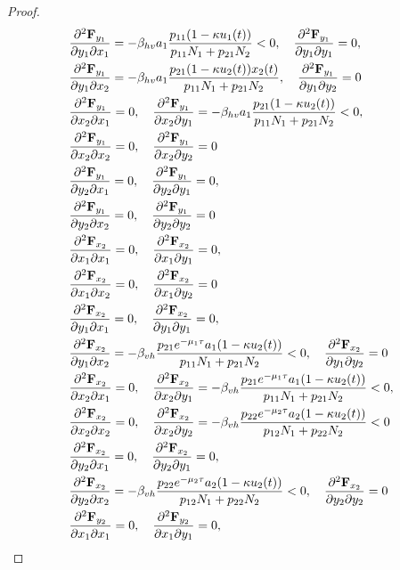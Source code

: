 \begin{proof}
{\begin{align*}
    &\pdv{\mathbf{F}_{y_1}}{y_1}{x_1} = -\beta_{hv} a_1 \frac{p_{11} (1-\kappa u_1(t))}{p_{11} N_1 + p_{21} N_2} < 0, \quad
    \pdv{\mathbf{F}_{y_1}}{y_1}{y_1} = 0, \\
    &\pdv{\mathbf{F}_{y_1}}{y_1}{x_2} = -\beta_{hv} a_1 \frac{p_{21} (1-\kappa u_2(t)) x_2(t)}{p_{11} N_1 + p_{21} N_2}, \quad
    \pdv{\mathbf{F}_{y_1}}{y_1}{y_2} = 0 \\
    &\pdv{\mathbf{F}_{y_1}}{x_2}{x_1} = 0, \quad
    \pdv{\mathbf{F}_{y_1}}{x_2}{y_1} = -\beta_{hv} a_1 \frac{p_{21} (1-\kappa u_2(t))}{p_{11} N_1 + p_{21} N_2} < 0, \\
    &\pdv{\mathbf{F}_{y_1}}{x_2}{x_2} = 0, \quad
    \pdv{\mathbf{F}_{y_1}}{x_2}{y_2} = 0 \\
    &\pdv{\mathbf{F}_{y_1}}{y_2}{x_1} = 0, \quad
    \pdv{\mathbf{F}_{y_1}}{y_2}{y_1} = 0, \\
    &\pdv{\mathbf{F}_{y_1}}{y_2}{x_2} = 0, \quad
    \pdv{\mathbf{F}_{y_1}}{y_2}{y_2} = 0 \\
    &\pdv{\mathbf{F}_{x_2}}{x_1}{x_1} = 0, \quad
    \pdv{\mathbf{F}_{x_2}}{x_1}{y_1} = 0, \\
    &\pdv{\mathbf{F}_{x_2}}{x_1}{x_2} = 0, \quad
    \pdv{\mathbf{F}_{x_2}}{x_1}{y_2} = 0 \\
    &\pdv{\mathbf{F}_{x_2}}{y_1}{x_1} = 0, \quad
    \pdv{\mathbf{F}_{x_2}}{y_1}{y_1} = 0, \\
    &\pdv{\mathbf{F}_{x_2}}{y_1}{x_2} = -\beta_{vh} \frac{p_{21} e^{-\mu_1 \tau} a_1 (1-\kappa u_2(t))}{p_{11} N_1 + p_{21} N_2} < 0, \quad
    \pdv{\mathbf{F}_{x_2}}{y_1}{y_2} = 0 \\
    &\pdv{\mathbf{F}_{x_2}}{x_2}{x_1} = 0, \quad
    \pdv{\mathbf{F}_{x_2}}{x_2}{y_1} = -\beta_{vh} \frac{p_{21} e^{-\mu_1 \tau} a_1 (1-\kappa u_2(t))}{p_{11} N_1 + p_{21} N_2} < 0, \\
    &\pdv{\mathbf{F}_{x_2}}{x_2}{x_2} = 0, \quad
    \pdv{\mathbf{F}_{x_2}}{x_2}{y_2} = -\beta_{vh} \frac{p_{22} e^{-\mu_2 \tau} a_2 (1-\kappa u_2(t))}{p_{12} N_1 + p_{22} N_2} < 0 \\
    &\pdv{\mathbf{F}_{x_2}}{y_2}{x_1} = 0, \quad
    \pdv{\mathbf{F}_{x_2}}{y_2}{y_1} = 0, \\
    &\pdv{\mathbf{F}_{x_2}}{y_2}{x_2} = -\beta_{vh} \frac{p_{22} e^{-\mu_2 \tau} a_2 (1-\kappa u_2(t))}{p_{12} N_1 + p_{22} N_2} < 0, \quad
    \pdv{\mathbf{F}_{x_2}}{y_2}{y_2} = 0 \\
    &\pdv{\mathbf{F}_{y_2}}{x_1}{x_1} = 0, \quad
    \pdv{\mathbf{F}_{y_2}}{x_1}{y_1} = 0, \\

\end{align*}}
\end{proof}

